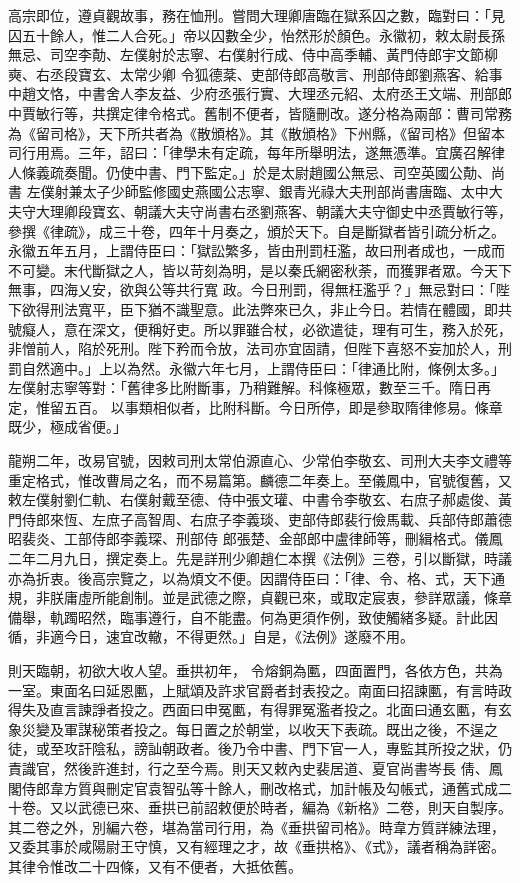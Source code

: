 \begin{pinyinscope}
 高宗即位，遵貞觀故事，務在恤刑。嘗問大理卿唐臨在獄系囚之數，臨對曰：「見囚五十餘人，惟二人合死。」帝以囚數全少，怡然形於顏色。永徽初，敕太尉長孫無忌、司空李勣、左僕射於志寧、右僕射行成、侍中高季輔、黃門侍郎宇文節柳奭、右丞段寶玄、太常少卿
 令狐德棻、吏部侍郎高敬言、刑部侍郎劉燕客、給事中趙文恪，中書舍人李友益、少府丞張行實、大理丞元紹、太府丞王文端、刑部郎中賈敏行等，共撰定律令格式。舊制不便者，皆隨刪改。遂分格為兩部：曹司常務為《留司格》，天下所共者為《散頒格》。其《散頒格》下州縣，《留司格》但留本司行用焉。三年，詔曰：「律學未有定疏，每年所舉明法，遂無憑準。宜廣召解律人條義疏奏聞。仍使中書、門下監定。」於是太尉趙國公無忌、司空英國公勣、尚書
 左僕射兼太子少師監修國史燕國公志寧、銀青光祿大夫刑部尚書唐臨、太中大夫守大理卿段寶玄、朝議大夫守尚書右丞劉燕客、朝議大夫守御史中丞賈敏行等，參撰《律疏》，成三十卷，四年十月奏之，頒於天下。自是斷獄者皆引疏分析之。永徽五年五月，上謂侍臣曰：「獄訟繁多，皆由刑罰枉濫，故曰刑者成也，一成而不可變。末代斷獄之人，皆以苛刻為明，是以秦氏網密秋荼，而獲罪者眾。今天下無事，四海乂安，欲與公等共行寬
 政。今日刑罰，得無枉濫乎？」無忌對曰：「陛下欲得刑法寬平，臣下猶不識聖意。此法弊來已久，非止今日。若情在體國，即共號癡人，意在深文，便稱好吏。所以罪雖合杖，必欲遣徒，理有可生，務入於死，非憎前人，陷於死刑。陛下矜而令放，法司亦宜固請，但陛下喜怒不妄加於人，刑罰自然適中。」上以為然。永徽六年七月，上謂侍臣曰：「律通比附，條例太多。」左僕射志寧等對：「舊律多比附斷事，乃稍難解。科條極眾，數至三千。隋日再定，惟留五百。
 以事類相似者，比附科斷。今日所停，即是參取隋律修易。條章既少，極成省便。」



 龍朔二年，改易官號，因敕司刑太常伯源直心、少常伯李敬玄、司刑大夫李文禮等重定格式，惟改曹局之名，而不易篇第。麟德二年奏上。至儀鳳中，官號復舊，又敕左僕射劉仁軌、右僕射戴至德、侍中張文瓘、中書令李敬玄、右庶子郝處俊、黃門侍郎來恆、左庶子高智周、右庶子李義琰、吏部侍郎裴行儉馬載、兵部侍郎蕭德昭裴炎、工部侍郎李義琛、刑部侍
 郎張楚、金部郎中盧律師等，刪緝格式。儀鳳二年二月九日，撰定奏上。先是詳刑少卿趙仁本撰《法例》三卷，引以斷獄，時議亦為折衷。後高宗覽之，以為煩文不便。因謂侍臣曰：「律、令、格、式，天下通規，非朕庸虛所能創制。並是武德之際，貞觀已來，或取定宸衷，參詳眾議，條章備舉，軌躅昭然，臨事遵行，自不能盡。何為更須作例，致使觸緒多疑。計此因循，非適今日，速宜改轍，不得更然。」自是，《法例》遂廢不用。



 則天臨朝，初欲大收人望。垂拱初年，
 令熔銅為匭，四面置門，各依方色，共為一室。東面名曰延恩匭，上賦頌及許求官爵者封表投之。南面曰招諫匭，有言時政得失及直言諫諍者投之。西面曰申冤匭，有得罪冤濫者投之。北面曰通玄匭，有玄象災變及軍謀秘策者投之。每日置之於朝堂，以收天下表疏。既出之後，不逞之徒，或至攻訐陰私，謗訕朝政者。後乃令中書、門下官一人，專監其所投之狀，仍責識官，然後許進封，行之至今焉。則天又敕內史裴居道、夏官尚書岑長
 倩、鳳閣侍郎韋方質與刪定官袁智弘等十餘人，刪改格式，加計帳及勾帳式，通舊式成二十卷。又以武德已來、垂拱已前詔敕便於時者，編為《新格》二卷，則天自製序。其二卷之外，別編六卷，堪為當司行用，為《垂拱留司格》。時韋方質詳練法理，又委其事於咸陽尉王守慎，又有經理之才，故《垂拱格》、《式》，議者稱為詳密。其律令惟改二十四條，又有不便者，大抵依舊。




\end{pinyinscope}

